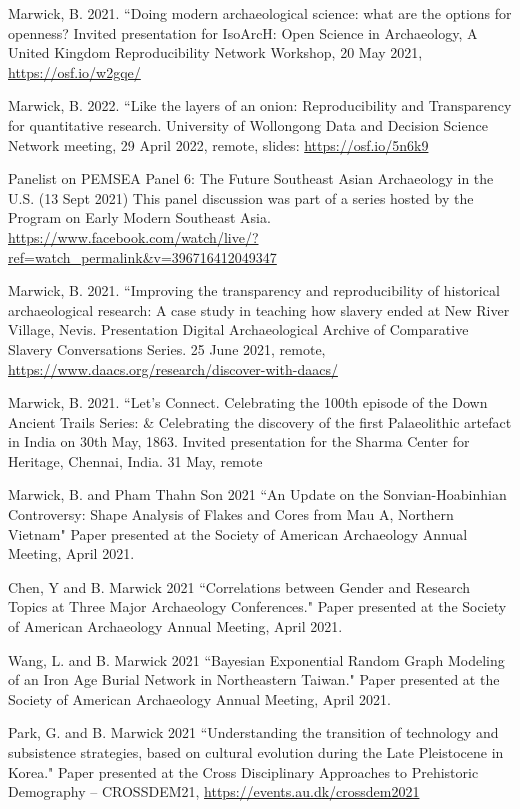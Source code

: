 \ind Marwick, B. 2021. ``Doing modern archaeological science: what are the options for openness? Invited presentation for IsoArcH: Open Science in Archaeology, A United Kingdom Reproducibility Network Workshop, 20 May 2021,  \url{https://osf.io/w2gqe/}  

\ind Marwick, B. 2022. ``Like the layers of an onion: Reproducibility and Transparency for quantitative research. University of Wollongong Data and Decision Science Network meeting, 29 April 2022, remote, slides:  \url{https://osf.io/5n6k9}  

\ind Panelist on PEMSEA Panel 6: The Future Southeast Asian Archaeology in the U.S. (13 Sept 2021) This panel discussion was part of a series hosted by the Program on Early Modern Southeast Asia.  \url{https://www.facebook.com/watch/live/?ref=watch_permalink&v=396716412049347}   

\ind Marwick, B. 2021. ``Improving the transparency and reproducibility of historical archaeological research: A case study in teaching how slavery ended at New River Village, Nevis. Presentation Digital Archaeological Archive of Comparative Slavery Conversations Series. 25 June 2021, remote,  \url{https://www.daacs.org/research/discover-with-daacs/}  

\ind Marwick, B. 2021. ``Let's Connect. Celebrating the 100th episode of the Down Ancient Trails Series: \& Celebrating the discovery of the first Palaeolithic artefact in India on 30th May, 1863. Invited presentation for the Sharma Center for Heritage, Chennai, India. 31 May, remote 

\ind Marwick, B. and Pham Thahn Son 2021 ``An Update on the Sonvian-Hoabinhian Controversy: Shape Analysis of Flakes and Cores from Mau A, Northern Vietnam" Paper presented at the Society of American Archaeology Annual Meeting, April 2021. 

\ind Chen, Y and B. Marwick 2021 ``Correlations between Gender and Research Topics at Three Major Archaeology Conferences." Paper presented at the Society of American Archaeology Annual Meeting, April 2021. 

\ind Wang, L. and B. Marwick 2021 ``Bayesian Exponential Random Graph Modeling of an Iron Age Burial Network in Northeastern Taiwan." Paper presented at the Society of American Archaeology Annual Meeting, April 2021.  

\ind Park, G. and B. Marwick 2021 ``Understanding the transition of technology and subsistence strategies, based on cultural evolution during the Late Pleistocene in Korea." Paper presented at the Cross Disciplinary Approaches to Prehistoric Demography – CROSSDEM21,  \url{https://events.au.dk/crossdem2021}  

